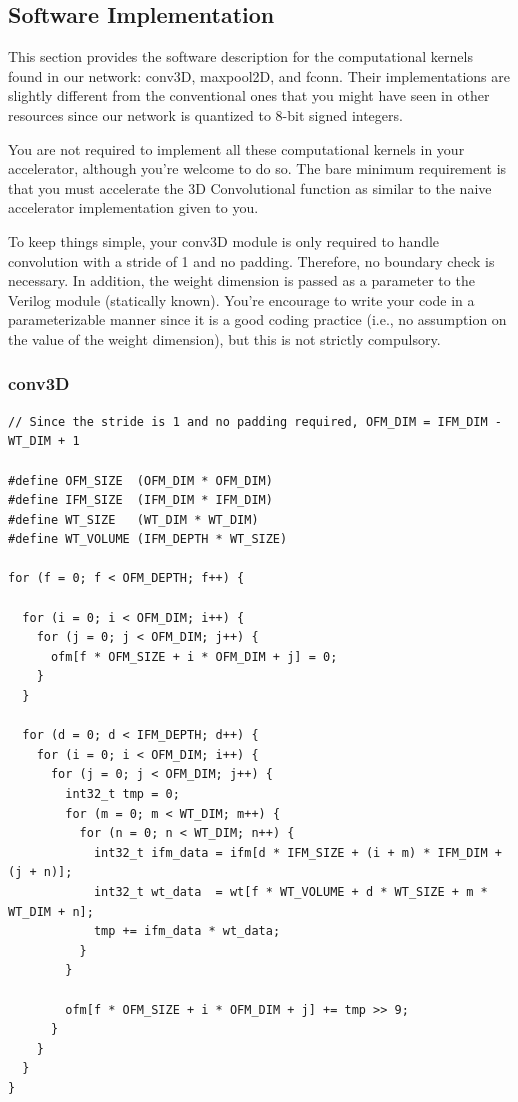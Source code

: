 \documentclass[11pt]{article}
\begin{document}
\subsection{Software Implementation}

This section provides the software description for the computational kernels found in our network: conv3D, maxpool2D, and fconn. Their implementations are slightly different from the conventional ones that you might have seen in other resources since our network is quantized to 8-bit signed integers.

You are not required to implement all these computational kernels in your accelerator, although you're welcome to do so. The bare minimum requirement is that you must accelerate the 3D Convolutional function as similar to the naive accelerator implementation given to you.

To keep things simple, your conv3D module is only required to handle convolution with a stride of 1 and no padding. Therefore, no boundary check is necessary. In addition, the weight dimension is passed as a parameter to the Verilog module (statically known). You're encourage to write your code in a parameterizable manner since it is a good coding practice (i.e., no assumption on the value of the weight dimension), but this is not strictly compulsory.

\subsubsection{conv3D}

\begin{verbatim}
// Since the stride is 1 and no padding required, OFM_DIM = IFM_DIM - WT_DIM + 1

#define OFM_SIZE  (OFM_DIM * OFM_DIM)
#define IFM_SIZE  (IFM_DIM * IFM_DIM)
#define WT_SIZE   (WT_DIM * WT_DIM)
#define WT_VOLUME (IFM_DEPTH * WT_SIZE)

for (f = 0; f < OFM_DEPTH; f++) {

  for (i = 0; i < OFM_DIM; i++) {
    for (j = 0; j < OFM_DIM; j++) {
      ofm[f * OFM_SIZE + i * OFM_DIM + j] = 0;
    }
  }

  for (d = 0; d < IFM_DEPTH; d++) {
    for (i = 0; i < OFM_DIM; i++) {
      for (j = 0; j < OFM_DIM; j++) {
        int32_t tmp = 0;
        for (m = 0; m < WT_DIM; m++) {
          for (n = 0; n < WT_DIM; n++) {
            int32_t ifm_data = ifm[d * IFM_SIZE + (i + m) * IFM_DIM + (j + n)];
            int32_t wt_data  = wt[f * WT_VOLUME + d * WT_SIZE + m * WT_DIM + n];
            tmp += ifm_data * wt_data;
          }
        }

        ofm[f * OFM_SIZE + i * OFM_DIM + j] += tmp >> 9;
      }
    }
  }
}

\end{verbatim}
\end{document}
